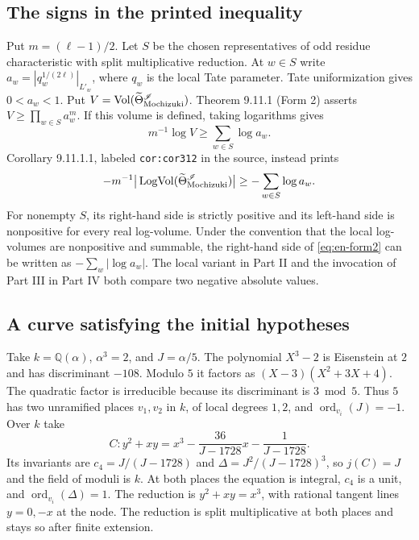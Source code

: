 \documentclass[UTF8,fontset=none,zihao=-4,a4paper]{ctexart}
\newcommand{\Q}{\mathbb Q}
\newcommand{\Vol}{\operatorname{Vol}}
\newcommand{\LogVol}{\operatorname{LogVol}}
\newcommand{\ord}{\operatorname{ord}}
\begin{document}
\subsection{The signs in the printed inequality}
Put \(m=(\ell-1)/2\). Let \(S\) be the chosen representatives of odd residue characteristic with split multiplicative reduction. At \(w\in S\) write \(a_w=|q_w^{1/(2\ell)}|_{L'_w}\), where \(q_w\) is the local Tate parameter. Tate uniformization gives \(0<a_w<1\). Put \(V=\Vol(\widetilde\Theta_{\rm Mochizuki}^{\mathscr I})\). Theorem 9.11.1 (Form 2) asserts \(V\ge\prod_{w\in S}a_w^m\). If this volume is defined, taking logarithms gives
\begin{equation}
 m^{-1}\log V\ge\sum_{w\in S}\log a_w. \label{eq:en-form2}
\end{equation}
Corollary 9.11.1.1, labeled \texttt{cor:cor312} in the source, instead prints
\begin{equation}
 -m^{-1}\big|\LogVol(\widetilde\Theta_{\rm Mochizuki}^{\mathscr I})\big|
 \ge -\sum_{w\in S}\log a_w. \label{eq:en-printed}
\end{equation}
For nonempty \(S\), its right-hand side is strictly positive and its left-hand side is nonpositive for every real log-volume. Under the convention that the local log-volumes are nonpositive and summable, the right-hand side of \eqref{eq:en-form2} can be written as \(-\sum_w|\log a_w|\). The local variant in Part II and the invocation of Part III in Part IV both compare two negative absolute values.\cite{jii,jiii,jiv}

\subsection{A curve satisfying the initial hypotheses}
Take \(k=\Q(\alpha)\), \(\alpha^3=2\), and \(J=\alpha/5\). The polynomial \(X^3-2\) is Eisenstein at \(2\) and has discriminant \(-108\). Modulo \(5\) it factors as \((X-3)(X^2+3X+4)\). The quadratic factor is irreducible because its discriminant is \(3\bmod 5\). Thus \(5\) has two unramified places \(v_1,v_2\) in \(k\), of local degrees \(1,2\), and \(\ord_{v_i}(J)=-1\). Over \(k\) take
\[
 C\colon y^2+xy=x^3-\frac{36}{J-1728}x-\frac1{J-1728}.
\]
Its invariants are \(c_4=J/(J-1728)\) and \(\Delta=J^2/(J-1728)^3\), so \(j(C)=J\) and the field of moduli is \(k\). At both places the equation is integral, \(c_4\) is a unit, and \(\ord_{v_i}(\Delta)=1\). The reduction is \(y^2+xy=x^3\), with rational tangent lines \(y=0,-x\) at the node. The reduction is split multiplicative at both places and stays so after finite extension.
\end{document}
